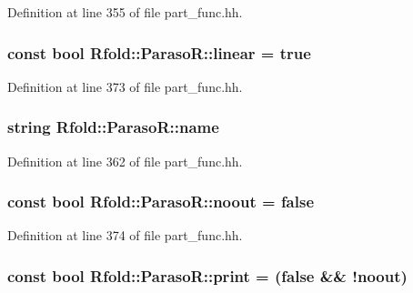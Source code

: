 Definition at line 355 of file part\+\_\+func.\+hh.

\hypertarget{class_rfold_1_1_paraso_r_a45220d67941bf0c7f97c1eb586511cb8}{
\subsubsection[{linear}]{\setlength{\rightskip}{0pt plus 5cm}const bool Rfold\+::\+Paraso\+R\+::linear = true\hspace{0.3cm}{\ttfamily [static]}}}\label{class_rfold_1_1_paraso_r_a45220d67941bf0c7f97c1eb586511cb8}


Definition at line 373 of file part\+\_\+func.\+hh.

\hypertarget{class_rfold_1_1_paraso_r_a52b17c1475bc8319251b6fbde1a5a6d9}{
\subsubsection[{name}]{\setlength{\rightskip}{0pt plus 5cm}string Rfold\+::\+Paraso\+R\+::name}}\label{class_rfold_1_1_paraso_r_a52b17c1475bc8319251b6fbde1a5a6d9}


Definition at line 362 of file part\+\_\+func.\+hh.

\hypertarget{class_rfold_1_1_paraso_r_af4875402eee0ce6bfd06e1cd35ea1c4a}{
\subsubsection[{noout}]{\setlength{\rightskip}{0pt plus 5cm}const bool Rfold\+::\+Paraso\+R\+::noout = false\hspace{0.3cm}{\ttfamily [static]}}}\label{class_rfold_1_1_paraso_r_af4875402eee0ce6bfd06e1cd35ea1c4a}


Definition at line 374 of file part\+\_\+func.\+hh.

\hypertarget{class_rfold_1_1_paraso_r_a11f8ab335a786811c32a9b430fcf4d2a}{
\subsubsection[{print}]{\setlength{\rightskip}{0pt plus 5cm}const bool Rfold\+::\+Paraso\+R\+::print = (false \&\& !{\bf noout})\hspace{0.3cm}{\ttfamily [static]}}}\label{class_rfold_1_1_paraso_r_a11f8ab335a786811c32a9b430fcf4d2a}


